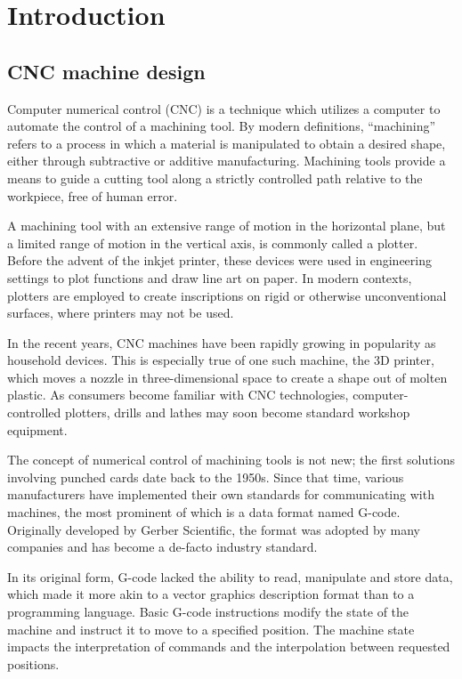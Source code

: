 \clearpage
\section{Introduction}

\subsection{CNC machine design}

Computer numerical control (CNC) is a technique which utilizes a computer to
automate the control of a machining tool. By modern definitions, ``machining''
refers to a process in which a material is manipulated to obtain a desired
shape, either through subtractive or additive manufacturing. Machining tools
provide a means to guide a cutting tool along a strictly controlled path
relative to the workpiece, free of human error.

A machining tool with an extensive range of motion in the horizontal plane, but
a limited range of motion in the vertical axis, is commonly called a plotter.
Before the advent of the inkjet printer, these devices were used in engineering
settings to plot functions and draw line art on paper. In modern contexts,
plotters are employed to create inscriptions on rigid or otherwise
unconventional surfaces, where printers may not be used.

In the recent years, CNC machines have been rapidly growing in popularity as
household devices. This is especially true of one such machine, the 3D printer,
which moves a nozzle in three-dimensional space to create a shape out of molten
plastic. As consumers become familiar with CNC technologies, computer-controlled
plotters, drills and lathes may soon become standard workshop equipment.

The concept of numerical control of machining tools is not new; the first
solutions involving punched cards date back to the 1950s. Since that time,
various manufacturers have implemented their own standards for communicating
with machines, the most prominent of which is a data format named G-code.
Originally developed by Gerber Scientific, the format was adopted by many
companies and has become a de-facto industry standard.

In its original form, G-code lacked the ability to read, manipulate and store
data, which made it more akin to a vector graphics description format than to a
programming language. Basic G-code instructions modify the state of the machine
and instruct it to move to a specified position. The machine state impacts the
interpretation of commands and the interpolation between requested positions.

